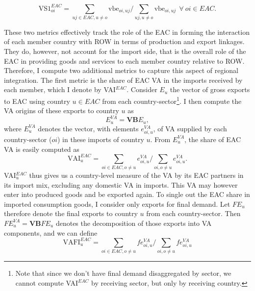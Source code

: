 \documentclass[a4paper]{article}
\begin{document}
\begin{equation} \label{eq:VS1_EAC}
\text{VS1}_{oi}^{EAC} =  \sum_{uj \in EAC, u \neq  o} \text{vbe}_{oi, uj} \bigg/ \sum_{uj, u \neq  o} \text{vbe}_{oi, uj}\ \ \forall\ oi \in EAC.
\end{equation}

These two metrics effectively track the role of the EAC in forming the interaction of each member country with ROW in terms of production and export linkages. They do, however, not account for the import side, that is the overall role of the EAC in providing goods and services to each member country relative to ROW. Therefore, I compute two additional metrics to capture this aspect of regional integration. The first metric is the share of EAC VA in the imports received by each member, which I denote by VAI$^{EAC}$. Consider $E_u$ the vector of gross exports to EAC using country $u \in EAC$ from each country-sector\footnote{Note that since we don't have final demand disaggregated by sector, we cannot compute VAI$^{EAC}$ by receiving sector, but only by receiving country.}.%
I then compute the VA origins of these exports to country $u$ as 
\begin{equation}
E_u^{VA} = \textbf{VB}E_u,
\end{equation}
 where $E_u^{VA}$ denotes the vector, with elements $e_{oi, u}^{VA}$, of VA supplied by each country-sector ($oi$) in these imports of country $u$. From  $E_u^{VA}$, the share of EAC VA is easily computed as 
\begin{equation}
\text{VAI}_u^{EAC} = \sum_{oi \in EAC, o \neq u}  e_{oi, u}^{VA}  \bigg/ \sum_{oi, o \neq u}  e_{oi, u}^{VA}.  
\end{equation}
VAI$_u^{EAC}$ thus gives us a country-level measure of the VA by its EAC partners in its import mix, excluding any domestic VA in imports. This VA may however enter into produced goods and be exported again. %
To single out the EAC share in imported consumption goods, I consider only exports for final demand. %
Let $FE_u$ therefore denote the final exports to country $u$ from each country-sector. Then $FE_u^{VA} = \textbf{VB}FE_u$ denotes the decomposition of those exports into VA components, and we can define 
\begin{equation}
\text{VAFI}_{u}^{EAC} = \sum_{oi \in EAC, o \neq u}  fe_{oi, u}^{VA}  \bigg/ \sum_{oi, o \neq u}  fe_{oi, u}^{VA}
\end{equation}
\end{document}
